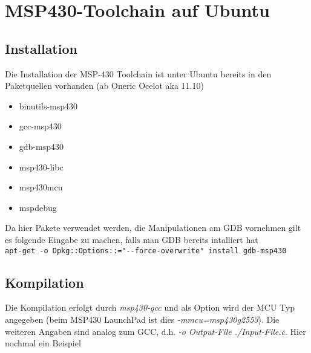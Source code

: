 



\section{MSP430-Toolchain auf Ubuntu}
\subsection{Installation}
Die Installation der MSP-430 Toolchain ist unter Ubuntu bereits in den 
Paketquellen vorhanden (ab Oneric Ocelot aka 11.10)

\begin{itemize}
    \item binutils-msp430 
    \item gcc-msp430 
    \item gdb-msp430 
    \item msp430-libc 
    \item msp430mcu 
    \item mspdebug
\end{itemize}

\noindent
Da hier Pakete verwendet werden, die Manipulationen am GDB vornehmen gilt es
folgende Eingabe zu machen, falls man GDB bereits intalliert hat \\

\verb?apt-get -o Dpkg::Options::="--force-overwrite" install gdb-msp430?

\subsection{Kompilation}
Die Kompilation erfolgt durch \emph{msp430-gcc} und als Option wird der MCU Typ
angegeben (beim MSP430 LaunchPad ist dies \emph{-mmcu=msp430g2553}). Die weiteren
Angaben sind analog zum GCC, d.h. \emph{-o Output-File ./Input-File.c}.
Hier nochmal ein Beispiel \\

